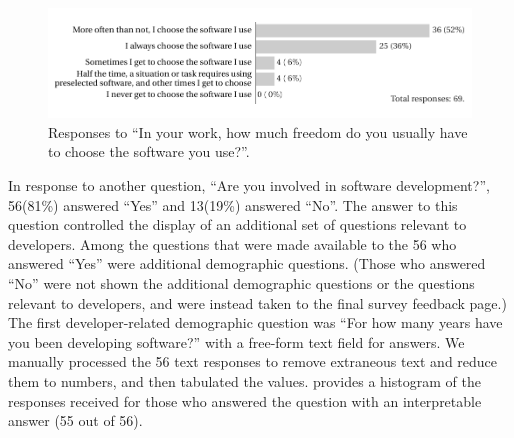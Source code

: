 \documentclass{casicswhitepaper}
\newcommand{\totalDevelopers}{56\xspace}
\newcommand{\totalNotDevelopers}{13\xspace}
\begin{document}
\begin{figure}[htb]
  \centering
  \includegraphics{files/plots/how-often-choose-software.pdf}
  \vspace*{-4ex}
  \caption{Responses to ``In your work, how much freedom do you usually have to choose the software you use?''.}
  \label{freedom}
\end{figure}

In response to another question, ``Are you involved in software development?'', \totalDevelopers (81\%) answered ``Yes'' and \totalNotDevelopers (19\%) answered ``No''.  The answer to this question controlled the display of an additional set of questions relevant to developers.  Among the questions that were made available to the \totalDevelopers who answered ``Yes'' were additional demographic questions.  (Those who answered ``No'' were not shown the additional demographic questions or the questions relevant to developers, and were instead taken to the final survey feedback page.)  The first developer-related demographic question was ``For how many years have you been developing software?'' with a free-form text field for answers.  We manually processed the \totalDevelopers text responses to remove extraneous text and reduce them to numbers, and then tabulated the values.   provides a histogram of the responses received for those who answered the question with an interpretable answer (55 out of \totalDevelopers).

\end{document}
